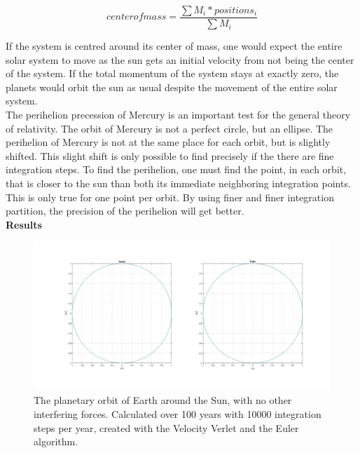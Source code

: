 \documentclass[10pt,a4paper]{article}
\begin{document}
$$center of mass = \frac{\sum M_i*positions_i}{\sum M_i} $$

\noindent If the system is centred around its center of mass, one would expect the entire solar system to move as the sun gets an initial velocity from not being the center of the system. If the total momentum of the system stays at exactly zero, the planets would orbit the sun as usual despite the movement of the entire solar system.\\

\noindent The perihelion precession of Mercury is an important test for the general theory of relativity. The orbit of Mercury is not a perfect circle, but an ellipse. The perihelion of Mercury is not at the same place for each orbit, but is slightly shifted. This slight shift is only possible to find precisely if the there are fine integration steps. To find the perihelion, one must find the point, in each orbit, that is closer to the sun than both its immediate neighboring integration points. This is only true for one point per orbit. By using finer and finer integration partition, the precision of the perihelion will get better. \\  






   





\newpage
{\LARGE\bf
Results
}\\
\begin{figure} [H]  

\centerline{\includegraphics[scale=0.3]{FirstModel.jpg}}
\caption{The planetary orbit of Earth around the Sun, with no other interfering forces. Calculated over 100 years with 10000 integration steps per year, created with the Velocity Verlet and the Euler algorithm.}
\end{figure}
\end{document}
